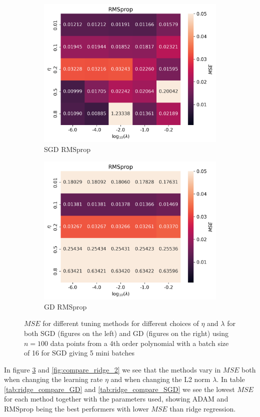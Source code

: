 \documentclass[11pt]{article}
\begin{document}
\begin{figure}[H]
    \begin{subfigure}{.5\textwidth}
        \centering
        \includegraphics[width=\textwidth]{../figures/RMSprop_SGD_eta_lmb.png}
        \caption{SGD RMSprop}
        \label{fig:}
    \end{subfigure}
    \begin{subfigure}{.5\textwidth}
        \centering
        \includegraphics[width=\textwidth]{../figures/RMSprop_GD_eta_lmb.png}
        \caption{GD RMSprop}
        \label{fig:}
    \end{subfigure}
    \caption{$MSE$ for different tuning methods for different choices of $\eta$ and $\lambda$ for both SGD (figures on the left) and GD (figures on the right) using $n=100$ data points from a 4th order polynomial with a batch size of 16 for SGD giving 5 mini batches}
    \label{fig:compare_ridge}
\end{figure}
In figure \ref{fig:compare_ridge} and \ref{fig:compare_ridge_2} we see that the methods vary in $MSE$ both when changing the learning rate $\eta$ and when changing the L2 norm $\lambda$. In table \ref{tab:ridge_compare_GD} and \ref{tab:ridge_compare_SGD} we see the lowest $MSE$ for each method together with the parameters used, showing ADAM and RMSprop being the best performers with lower $MSE$ than ridge regression.
\end{document}
